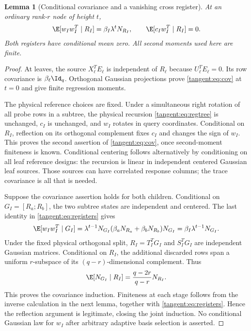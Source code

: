 \documentclass[11pt,oneside,openany,a4paper]{book}
\numberwithin{equation}{chapter}
\newtheorem{lemma}[theorem]{Lemma}
\theoremstyle{definition}
\theoremstyle{remark}
\begin{document}
\begin{lemma}[Conditional covariance and a vanishing cross register]\label{tangent:lem:cov}
At an ordinary rank-$r$ node of height $t$,
\begin{equation}\label{tangent:eq:cov}
 \E[w_Iw_I^T\mid R_I]=\beta_I\lambda^t N_{R_I},
 \qquad \E[c_Iw_I^T\mid R_I]=0.
\end{equation}
Both registers have conditional mean zero. All second moments used here are finite.
\end{lemma}
\begin{proof}
At leaves, the source $X_\ell^TE_\ell$ is independent of $R_\ell$ because $U_\ell^TE_\ell=0$. Its row covariance is $\beta_\ell\Id_q$. Orthogonal Gaussian projections prove \eqref{tangent:eq:cov} at $t=0$ and give finite regression moments.

The physical reference choices are fixed. Under a simultaneous right rotation of all probe rows in a subtree, the physical recursion \eqref{tangent:eq:regtree} is unchanged, $c_I$ is unchanged, and $w_I$ rotates in query coordinates. Conditional on $R_I$, reflection on its orthogonal complement fixes $c_I$ and changes the sign of $w_I$. This proves the second assertion of \eqref{tangent:eq:cov}, once second-moment finiteness is known. Conditional centering follows alternatively by conditioning on all leaf reference designs: the recursion is linear in independent centered Gaussian leaf sources. Those sources can have correlated response columns; the trace covariance is all that is needed.

Suppose the covariance assertion holds for both children. Conditional on $G_I=[R_a;R_b]$, the two subtree states are independent and centered. The last identity in \eqref{tangent:eq:registers} gives
\[
 \E[w_Iw_I^T\mid G_I]
 =\lambda^{t-1}N_{G_I}(\beta_aN_{R_a}+\beta_bN_{R_b})N_{G_I}
 =\beta_I\lambda^{t-1}N_{G_I}.
\]
Under the fixed physical orthogonal split, $R_I=T_I^TG_I$ and $S_I^TG_I$ are independent Gaussian matrices. Conditional on $R_I$, the additional discarded rows span a uniform $r$-subspace of its $(q-r)$-dimensional complement. Thus
\[
 \E[N_{G_I}\mid R_I]=\frac{q-2r}{q-r}N_{R_I}.
\]
This proves the covariance induction. Finiteness at each stage follows from the inverse calculation in the next lemma, together with \eqref{tangent:eq:registers}. Hence the reflection argument is legitimate, closing the joint induction. No conditional Gaussian law for $w_I$ after arbitrary adaptive basis selection is asserted.
\end{proof}
\end{document}
